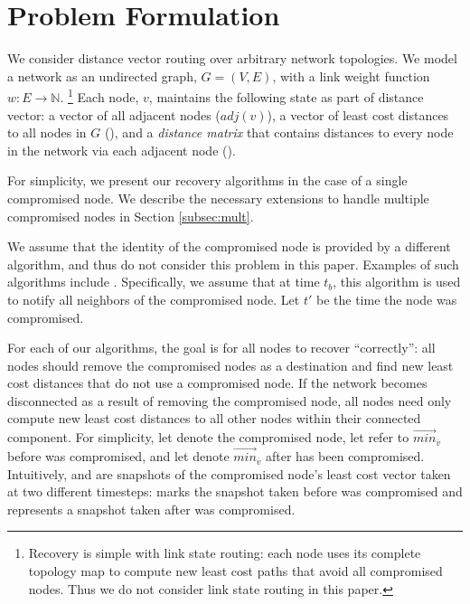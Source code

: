 \section{Problem Formulation}
\label{sec:problem}

We consider distance vector routing \cite{Gall87} over arbitrary network topologies. We model a network as an undirected graph, $G=(V,E)$,
with a link weight function $w: E \rightarrow \mathbb{N}$.
{\footnote {\small Recovery is simple with link state routing: each node uses its complete topology map to compute new least cost paths that avoid all compromised nodes.
Thus we do not consider link state routing in this paper.}}
Each node, $v$, maintains the following state as part of distance vector: a vector of all adjacent nodes ($adj(v)$), a vector of least cost distances to all
nodes in $G$ (\minvvs), and a \emph{distance matrix} that contains distances to every node in the network via each adjacent node (\dmatrixvs). 

For simplicity, we present our recovery algorithms in the case of a single compromised node. We describe the necessary extensions to handle multiple compromised nodes in Section \ref{subsec:mult}.

We assume that the identity of the compromised node is provided by a different algorithm, and thus do not consider this problem in this paper.
Examples of such algorithms include \cite{Arini,Feam,Vishal02,Pad03,Paul02}. %
Specifically, we assume that at time $t_b$, this algorithm is used to notify all neighbors of the 
compromised node. Let $t'$ be the time the node was compromised.

For each of our algorithms, the goal is for all nodes to recover ``correctly'': all nodes should remove the compromised nodes as a destination and find
new least cost distances that do not use a compromised node. If the network becomes disconnected as a result of removing the compromised node, all
nodes need only compute new least cost distances to all other nodes within their connected component.
For simplicity, let \bad denote the compromised node, let \oldvector refer to $\overrightarrow{min}_{\overline{v}}$ 
before \bad was compromised, and let \badvector denote $\overrightarrow{min}_{\overline{v}}$ after \bad has been compromised.
Intuitively, \oldvector and \badvector are snapshots of the compromised node's least cost vector taken at two different timesteps: \oldvector marks the snapshot taken before \bad was compromised and 
\badvector represents a snapshot taken after \bad was compromised.

